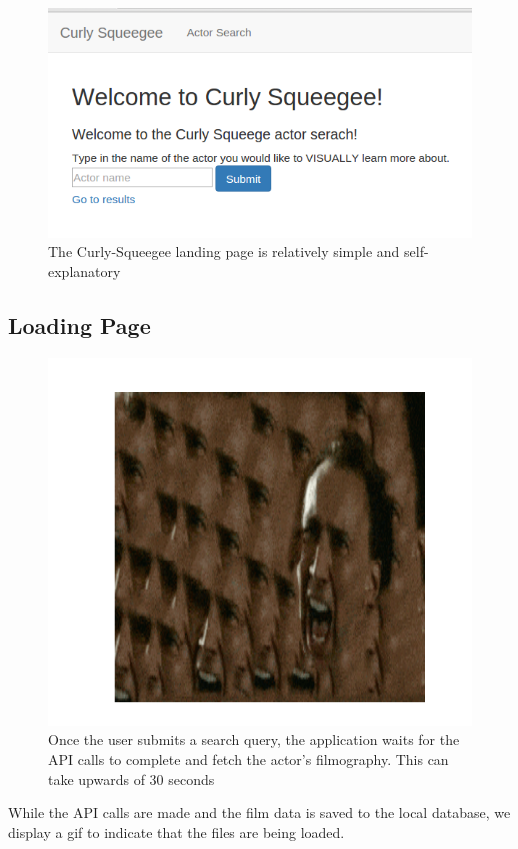 \documentclass[12pt]{article}
\begin{document}
	\begin{figure}[h!]
		\centering
		\includegraphics[scale=0.3]{images/landingPage.png}
		\caption{The Curly-Squeegee landing page is relatively simple and self-explanatory}
	\end{figure}


\subsection{Loading Page}

			\begin{figure}[h!]
				\centering
				\includegraphics[scale=0.3]{images/loadingPage.png}
				\caption{Once the user submits a search query, the application waits for the API calls to complete and fetch the actor's filmography.  This can take upwards of 30 seconds}
			\end{figure}
			While the API calls are made and the film data is saved to the local database, we display a gif to indicate that the files are being loaded.
\end{document}
